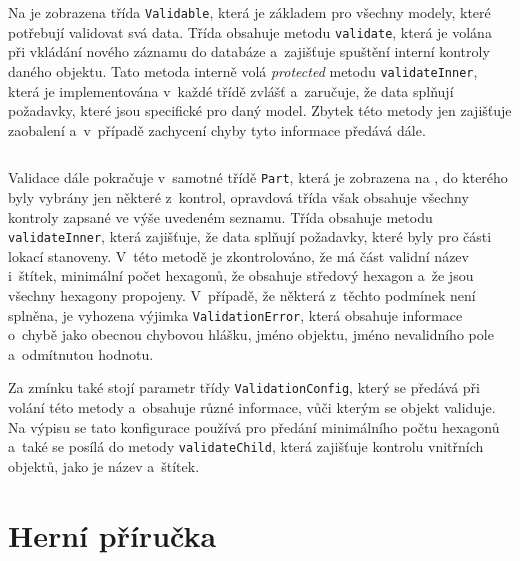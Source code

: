 \begin{listing}[h]
    \inputminted{Java}{code/Validable.java}
    \caption{Zdrojový kód třídy Validable}
    \label{code:validable}
\end{listing}

Na  je zobrazena třída \texttt{Validable}, která je základem pro všechny modely, které potřebují validovat svá data. Třída obsahuje metodu \texttt{validate}, která je volána při vkládání nového záznamu do databáze a~zajišťuje spuštění interní kontroly daného objektu. Tato metoda interně volá \textit{protected} metodu \texttt{validateInner}, která je implementována v~každé třídě zvlášť a~zaručuje, že data splňují požadavky, které jsou specifické pro daný model. Zbytek této metody jen zajišťuje zaobalení a~v~případě zachycení chyby tyto informace předává dále.

\begin{listing}[H]
    \inputminted{Java}{code/Part.java}
    \caption{Zdrojový kód třídy Part}
    \label{code:part}
\end{listing}

Validace dále pokračuje v~samotné třídě \texttt{Part}, která je zobrazena na , do kterého byly vybrány jen některé z~kontrol, opravdová třída však obsahuje všechny kontroly zapsané ve výše uvedeném seznamu. Třída obsahuje metodu \texttt{validateInner}, která zajišťuje, že data splňují požadavky, které byly pro části lokací stanoveny. V~této metodě je zkontrolováno, že má část validní název i~štítek, minimální počet hexagonů, že obsahuje středový hexagon a~že jsou všechny hexagony propojeny. V~případě, že některá z~těchto podmínek není splněna, je vyhozena výjimka \texttt{ValidationError}, která obsahuje informace o~chybě jako obecnou chybovou hlášku, jméno objektu, jméno nevalidního pole a~odmítnutou hodnotu.

Za zmínku také stojí parametr třídy  \texttt{ValidationConfig}, který se předává při volání této metody a~obsahuje různé informace, vůči kterým se objekt validuje. Na výpisu se tato konfigurace používá pro předání minimálního počtu hexagonů a~také se posílá do metody \texttt{validateChild}, která zajišťuje kontrolu vnitřních objektů, jako je název a~štítek.

\section{Herní příručka}
\label{sec:game_manual}

